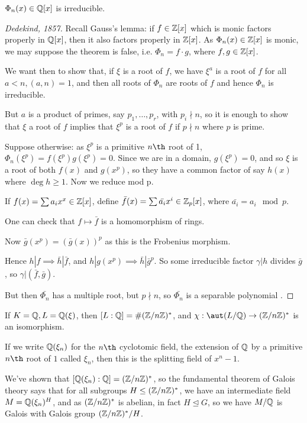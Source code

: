 \documentclass[a4paper, 10pt, twocolumn]{amsart}
\begin{document}
\begin{theorem}
$\Phi_n(x) \in \mathbb{Q}[x]$ is irreducible.
\end{theorem}
\begin{proof}[Dedekind, 1857]
Recall Gauss's lemma: if $f\in \mathbb{Z}[x]$ which is monic factors properly in $\mathbb{Q}[x]$, then it also factors properly in $\mathbb{Z}[x]$. As $\Phi_n(x) \in \mathbb{Z}[x]$ is monic, we may suppose the theorem is false, i.e. $\Phi_n = f\cdot g$, where $f,g \in \mathbb{Z}[x]$.

We want then to show that, if $\xi$ is a root of $f$, we have $\xi^a$ is a root of $f$ for all $a<n, (a,n)=1$, and then all roots of $\Phi_n$ are roots of $f$ and hence $\Phi_n$ is irreducible.

But $a$ is a product of primes, say $p_1, \ldots, p_r$, with $p_i \nmid n$, so it is enough to show that $\xi$ a root of $f$ implies that $\xi^p$ is a root of $f$ if $p\nmid n$ where $p$ is prime.

Suppose otherwise: as $\xi^p$ is a primitive $n\th$ root of 1, $\Phi_n(\xi^p) = f(\xi^p)g(\xi^p) = 0$. Since we are in a domain, $g(\xi^p) = 0$, and so $\xi$ is a root of both $f(x)$ and $g(x^p)$, so they have a common factor of say $h(x)$ where $\deg h \geq 1$. Now we reduce mod p.

If $f(x) = \sum a_i x^x \in \mathbb{Z}[x]$, define $\bar{f}(x) = \sum \bar{a_i}x^i \in \mathbb{Z}_p[x]$, where $\bar{a_i} = a_i \mod p$.

One can check that $f \mapsto \bar{f}$ is a homomorphism of rings.

Now $\bar{g}(x^p) = (\bar{g}(x))^p$ as this is the Frobenius morphism.

Hence $h|f \implies \bar{h}|\bar{f}$, and $h|g(x^p) \implies \bar{h}|\bar{g}^p$. So some irreducible factor $\gamma |h$ divides $\bar{g}$, so $\gamma|(\bar{f},\bar{g})$.

But then $\bar{\Phi_n}$ has a multiple root, but $p\nmid n$, so $\bar{\Phi_n}$ is a separable polynomial \contr.
\end{proof}
\begin{corollary}
If $K=\mathbb{Q}, L=\mathbb{Q}(\xi)$, then $[L:\mathbb{Q}] = \#(\mathbb{Z}/n\mathbb{Z})^{\ast}$, and $\chi:\aut(L/\Q) \to (\Z/n\Z)^{\ast}$ is an isomorphism.
\end{corollary}
If we write $\mathbb{Q}(\xi_n)$ for the $n\th$ cyclotomic field, the extension of $\mathbb{Q}$ by a primitive $n\th$ root of $1$ called $\xi_n$, then this is the splitting field of $x^n-1$.

We've shown that $[\mathbb{Q}(\xi_n):\mathbb{Q}] = (\mathbb{Z}/n\mathbb{Z})^{\ast}$, so the fundamental theorem of Galois theory says that for all subgroups $H \leq (\mathbb{Z}/n\mathbb{Z})^{\ast}$, we have an intermediate field $M = \mathbb{Q}(\xi_n)^H$, and as $(\mathbb{Z}/n\mathbb{Z})^{\ast}$ is abelian, in fact $H \trianglelefteq G$, so we have $M/\mathbb{Q}$ is Galois with Galois group $(\mathbb{Z}/n\mathbb{Z})^{\ast}/H$.
\end{document}
